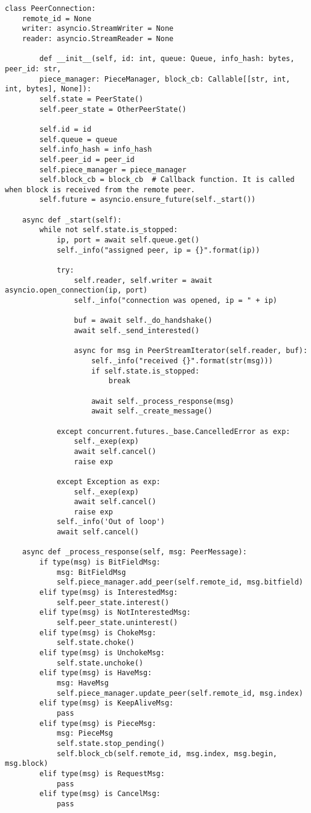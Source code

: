 
\begin{lstlisting}[caption = {Класс TorrentClient}]
class PeerConnection:
	remote_id = None
	writer: asyncio.StreamWriter = None
	reader: asyncio.StreamReader = None
	
		def __init__(self, id: int, queue: Queue, info_hash: bytes, peer_id: str,
		piece_manager: PieceManager, block_cb: Callable[[str, int, int, bytes], None]):
		self.state = PeerState()
		self.peer_state = OtherPeerState()
		
		self.id = id
		self.queue = queue
		self.info_hash = info_hash
		self.peer_id = peer_id
		self.piece_manager = piece_manager
		self.block_cb = block_cb  # Callback function. It is called when block is received from the remote peer.
		self.future = asyncio.ensure_future(self._start())
	
	async def _start(self):
		while not self.state.is_stopped:
			ip, port = await self.queue.get()
			self._info("assigned peer, ip = {}".format(ip))
			
			try:
				self.reader, self.writer = await asyncio.open_connection(ip, port)
				self._info("connection was opened, ip = " + ip)
				
				buf = await self._do_handshake()
				await self._send_interested()
				
				async for msg in PeerStreamIterator(self.reader, buf):
					self._info("received {}".format(str(msg)))
					if self.state.is_stopped:
						break
				
					await self._process_response(msg)
					await self._create_message()
	
			except concurrent.futures._base.CancelledError as exp:
				self._exep(exp)
				await self.cancel()
				raise exp
	
			except Exception as exp:
				self._exep(exp)
				await self.cancel()
				raise exp
			self._info('Out of loop')
			await self.cancel()
	
	async def _process_response(self, msg: PeerMessage):
		if type(msg) is BitFieldMsg:
			msg: BitFieldMsg
			self.piece_manager.add_peer(self.remote_id, msg.bitfield)
		elif type(msg) is InterestedMsg:
			self.peer_state.interest()
		elif type(msg) is NotInterestedMsg:
			self.peer_state.uninterest()
		elif type(msg) is ChokeMsg:
			self.state.choke()
		elif type(msg) is UnchokeMsg:
			self.state.unchoke()
		elif type(msg) is HaveMsg:
			msg: HaveMsg
			self.piece_manager.update_peer(self.remote_id, msg.index)
		elif type(msg) is KeepAliveMsg:
			pass
		elif type(msg) is PieceMsg:
			msg: PieceMsg
			self.state.stop_pending()
			self.block_cb(self.remote_id, msg.index, msg.begin, msg.block)
		elif type(msg) is RequestMsg:
			pass
		elif type(msg) is CancelMsg:
			pass
		

\end{lstlisting}
